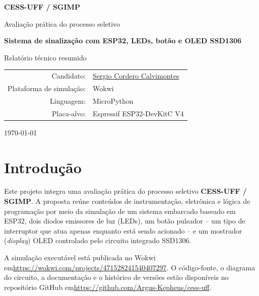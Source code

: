 \documentclass[12pt,a4paper]{article}
\newcommand{\ProjectTitle}{Sistema de sinalização com ESP32, LEDs, botão e OLED SSD1306}
\newcommand{\CandidateWebsite}{https://argus-kepheus.github.io/sergio-cordero-calvimontes/\#home}
\newcommand{\CandidateName}{\href{\CandidateWebsite}{Sergio Cordero Calvimontes}}
\newcommand{\WokwiURL}{https://wokwi.com/projects/471528241540407297}
\newcommand{\GitHubURL}{https://github.com/Argus-Kepheus/cess-uff}
\begin{document}
\begin{titlepage}
  \centering
  \vspace*{1.5cm}

  {\Large \textbf{CESS-UFF / SGIMP}\par}
  \vspace{0.7cm}
  {\large Avaliação prática do processo seletivo\par}

  \vfill

  {\huge\bfseries \ProjectTitle\par}
  \vspace{0.8cm}
  {\Large Relatório técnico resumido\par}

  \vfill

  \begin{tabular}{rl}
    Candidato: & \CandidateName \\
    Plataforma de simulação: & Wokwi \\
    Linguagem: & MicroPython \\
    Placa-alvo: & Espressif ESP32-DevKitC V4 \\
  \end{tabular}

  \vfill

  {\large \today\par}
\end{titlepage}

\tableofcontents
\newpage

\section{Introdução}

Este projeto integra uma avaliação prática do processo seletivo \textbf{CESS-UFF / SGIMP}. A proposta reúne conteúdos de instrumentação, eletrônica e lógica de programação por meio da simulação de um sistema embarcado baseado em ESP32, dois diodos emissores de luz (LEDs), um botão pulsador -- um tipo de interruptor que atua apenas enquanto está sendo acionado -- e um mostrador (\textit{display}) OLED controlado pelo circuito integrado SSD1306.

A simulação executável está publicada no Wokwi em\linebreak[2]
\url{\WokwiURL}. O código-fonte, o diagrama do circuito, a documentação e o histórico de versões estão disponíveis no repositório GitHub em\linebreak[2]
\url{\GitHubURL}.
\end{document}
